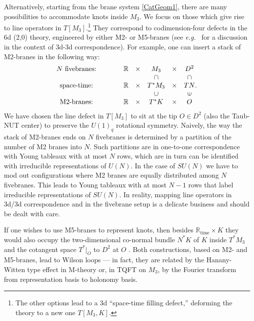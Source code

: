 \documentclass[hyper,letterpaper]{JHEP3}
\newcommand{\beq}{\begin{equation}\begin{aligned}}
\newcommand{\eeq}{\end{aligned}\end{equation}}
\newcommand{\R}{{\mathbb R}}
\def\eg{{\textit{e.g.}}}
\begin{document}
Alternatively, starting from the brane system \eqref{CatGeom1}, there are many possibilities \cite{Gukov:2015gmm}
to accommodate knots inside $M_3$. We focus on those which give rise to line operators in $T[M_3]$.\footnote{The other options lead to a 3d ``space-time filling defect,'' deforming the theory to a new one $T[M_3,K]$.} They correspond to codimension-four defects in the 6d (2,0) theory, engineered by either M2- or M5-branes (see \eg~\cite{Gang:2015bwa} for a discussion in the context of 3d-3d correspondence). For example, one can insert a stack of M2-branes in the following way:
\beq
\begin{matrix}
{\mbox {\textrm{$N$ fivebranes:}}}~~~\qquad & \R & \times & M_3& \times & D^2  \\ \qquad & &
&   \cap &  & \cap \\
{\mbox{\rm space-time:}}~~~\qquad & \R&  \times  & T^*M_3 & \times & TN   \\ \qquad & &
&   \cup &  & $\rotatebox[origin=c]{90}{$\in$}$ \\
{\mbox{\rm M2-branes:}}~~~\qquad &\R & \times & T^*K & \times  & O   \\
\end{matrix}.
\label{CatGeom2}
\eeq
We have chosen the line defect in $T[M_3]$ to sit at the tip $O\in D^2$ (also the Taub-NUT center) to preserve the $U(1)_q$ rotational symmetry.
Naively, the way the stack of M2-branes ends on $N$ fivebranes is determined by a partition of the number of M2 branes into $N$. Such partitions are in one-to-one correspondence with Young tableaux with at most $N$ rows, which are in turn can be identified with irreducible representations of $U(N)$. In the case of $SU(N)$ we have to mod out configurations where M2 branes are equally distributed among $N$ fivebranes. This leads to Young tableaux with at most $N-1$ rows that label irreducible representations of $SU(N)$.
In reality, mapping line operators in 3d/3d correspondence and in the fivebrane setup is a delicate business and should be dealt with care.

If one wishes to use M5-branes to represent knots, then besides $\R_{\text{time}}\times K$ they would also occupy
the two-dimensional co-normal bundle $N^*K$ of $K$ inside $T^*M_3$ and the cotangent space $T^*|_O$ to $D^2$ at $O$ \cite{Ooguri:1999bv}.
Both constructions, based on M2- and M5-branes, lead to Wilson loops --- in fact,
they are related by the Hanany-Witten type effect in M-theory or, in TQFT on $M_3$, by the Fourier transform
from representation basis to holonomy basis.
\end{document}
